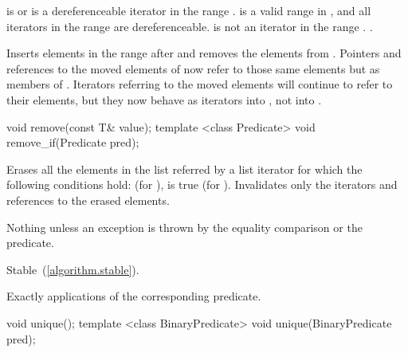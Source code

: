 \begin{itemdescr}
\pnum
\requires {} is  or is a
dereferenceable iterator in the range .  is a
valid range in , and all iterators in the range  are
dereferenceable.  is not an iterator in the range .
.

\pnum
\effects Inserts elements in the range  after  and
removes the elements from . Pointers and references to the moved elements of
 now refer to those same elements but as members of . Iterators
referring to the moved elements will continue to refer to their elements, but they now
behave as iterators into , not into .

\pnum
\complexity {}
\end{itemdescr}

%
%
\begin{itemdecl}
void remove(const T& value);
template <class Predicate> void remove_if(Predicate pred);
\end{itemdecl}

\begin{itemdescr}
\pnum
\effects Erases all the elements in the list referred by a list iterator  for
which the following conditions hold:  (for ),
 is true (for ).
Invalidates only the iterators and references to the erased elements.

\pnum
\throws Nothing unless an exception is thrown by the equality comparison or the
predicate.

\pnum
\remarks Stable~(\ref{algorithm.stable}).

\pnum
\complexity Exactly  applications of the corresponding
predicate.
\end{itemdescr}

%
\begin{itemdecl}
void unique();
template <class BinaryPredicate> void unique(BinaryPredicate pred);
\end{itemdecl}

